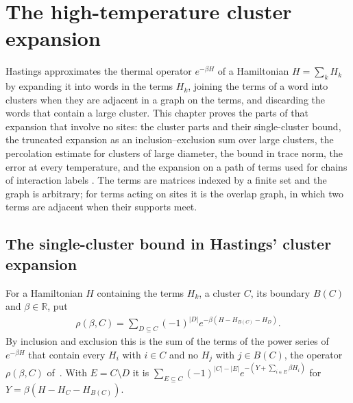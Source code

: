 \chapter{The high-temperature cluster expansion}
\label{chap:cluster_expansion}

Hastings \cite[Section~IV]{Hastings2006Solving} approximates the thermal
operator $e^{-\beta H}$ of a Hamiltonian $H=\sum_k H_k$ by expanding it into
words in the terms $H_k$, joining the terms of a word into clusters when they
are adjacent in a graph on the terms, and discarding the words that contain a
large cluster. This chapter proves the parts of that expansion that involve no
sites: the cluster parts and their single-cluster bound, the truncated
expansion as an inclusion--exclusion sum over large clusters, the percolation
estimate for clusters of large diameter, the bound in trace norm, the error at
every temperature, and the expansion on a path of terms used for chains of
interaction labels \cite{Arad2016RigorousRG}. The terms are matrices indexed
by a finite set and the graph is arbitrary; for terms acting on sites it is
the overlap graph, in which two terms are adjacent when their supports meet.

\section{The single-cluster bound in Hastings' cluster expansion}
\label{sec:hastings_single_cluster_bound}



\begin{definition}
    \label{def:hastings_cluster_part}
    \leanok
    For a Hamiltonian $H$ containing the terms $H_k$, a cluster $C$, its boundary
    $B(C)$ and $\beta\in\mathbb R$, put
    \begin{align}
        \rho(\beta,C)=\sum_{D\subseteq C}(-1)^{|D|}e^{-\beta(H-H_{B(C)}-H_D)}.
        \label{eq:hastings_cluster_part}
    \end{align}
    By inclusion and exclusion this is the sum of the terms of the power series
    of $e^{-\beta H}$ that contain every $H_i$ with $i\in C$ and no $H_j$ with
    $j\in B(C)$, the operator $\rho(\beta,C)$
    of~\cite[lines 1174--1177]{Hastings2006Solving}. With $E=C\setminus D$ it is
    $\sum_{E\subseteq C}(-1)^{|C|-|E|}e^{-(Y+\sum_{i\in E}\beta H_i)}$ for
    $Y=\beta(H-H_C-H_{B(C)})$.
\end{definition}

